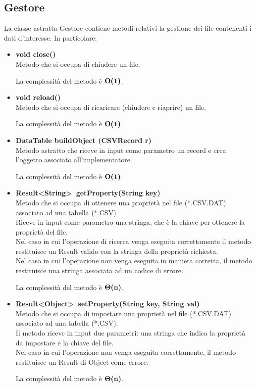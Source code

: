 \documentclass[a4paper, 12pt]{scrreprt}
\begin{document}
			\subsection{Gestore}
			La classe astratta Gestore contiene metodi relativi la gestione dei file contenenti i dati d'interesse. In particolare:
			\begin{itemize}
				\item \textbf{void close()}
				\\Metodo che si occupa di chiudere un file.
				
				La complessit\`a del metodo \`e $\mathbf{O}\textbf{(1)}$.
				
				\item \textbf{void reload()}
				\\Metodo che si occupa di ricaricare (chiudere e riaprire) un file.
				
				La complessit\`a del metodo \`e $\mathbf{O}\textbf{(1)}$.

				\item \textbf {DataTable buildObject (CSVRecord r)}
				\\Metodo astratto che riceve in input come parametro un record e crea l'oggetto associato all'implementatore.
				
				La complessit\`a del metodo \`e $\mathbf{O}\textbf{(1)}$.

				\item \textbf{Result\textless String\textgreater~getProperty(String key)}
				\\Metodo che si occupa di ottenere una propriet\`a nel file (*.CSV.DAT) associato ad una tabella (*.CSV).
				\\Riceve in input come parametro una stringa, che \`e la chiave per ottenere la propriet\`a del file.
				\\Nel caso in cui l'operazione di ricerca venga eseguita correttamente il metodo restituisce un Result valido con la stringa della propriet\`a richiesta.
				\\Nel caso in cui l'operazione non venga eseguita in maniera corretta, il metodo restituisce una stringa associata ad un codice di errore.
				
				La complessit\`a del metodo \`e $\mathbf{\Theta}\textbf{(n)}$.

				\item \textbf{Result\textless Object\textgreater~setProperty(String key, String val)}
				\\Metodo che si occupa di impostare una propriet\`a nel file (*.CSV.DAT) associato ad una tabella (*.CSV).
				\\Il metodo riceve in input due parametri: una stringa che indica la propriet\`a da impostare e la chiave del file.
				\\Nel caso in cui l'operazione non venga eseguita correttamente, il metodo restituisce un Result di Object come errore.
				
				La complessit\`a del metodo \`e $\mathbf{\Theta}\textbf{(n)}$.
				
			\end{itemize}
\end{document}
